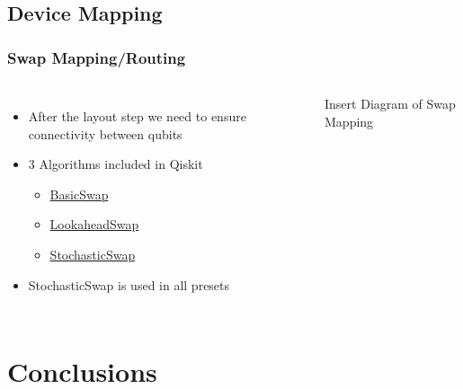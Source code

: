 \documentclass[aspectratio=169,11pt,hyperref={colorlinks=true}]{beamer}
\begin{document}
\subsection{Device Mapping}
\begin{frame}
    \frametitle{Swap Mapping/Routing}
    \begin{columns}
            \begin{itemize}
                \item After the layout step we need to ensure connectivity between qubits
                \item 3 Algorithms included in Qiskit
                    \begin{itemize}
                        \item \href{https://github.com/Qiskit/qiskit-terra/blob/master/qiskit/transpiler/passes/routing/basic_swap.py}{BasicSwap}
                        \item \href{https://github.com/Qiskit/qiskit-terra/blob/master/qiskit/transpiler/passes/routing/lookahead_swap.py}{LookaheadSwap}
                        \item \href{https://github.com/Qiskit/qiskit-terra/blob/master/qiskit/transpiler/passes/routing/stochastic_swap.py}{StochasticSwap}
                    \end{itemize}
                \item StochasticSwap is used in all presets
            \end{itemize}
            Insert Diagram of Swap Mapping
    \end{columns}
        
\end{frame}

\section{Conclusions}
\end{document}
